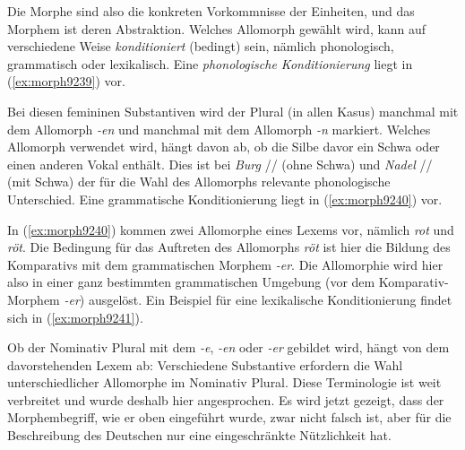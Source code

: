 Die Morphe sind also die konkreten Vorkommnisse der Einheiten, und das Morphem ist deren Abstraktion.
Welches Allomorph gewählt wird, kann auf verschiedene Weise \textit{konditioniert} (bedingt) sein, nämlich phonologisch, grammatisch oder lexikalisch.
Eine \textit{phonologische Konditionierung} liegt in (\ref{ex:morph9239}) vor.


\begin{exe}
  \ex{\label{ex:morph9239}}
  \begin{xlist}
  \end{xlist}
\end{exe}

Bei diesen femininen Substantiven wird der Plural (in allen Kasus) manchmal mit dem Allomorph \textit{-en} und manchmal mit dem Allomorph \textit{-n} markiert.
Welches Allomorph verwendet wird, hängt davon ab, ob die Silbe davor ein Schwa oder einen anderen Vokal enthält.
Dies ist bei \textit{Burg} // (ohne Schwa) und \textit{Nadel} // (mit Schwa) der für die Wahl des Allomorphs relevante phonologische Unterschied.
Eine grammatische Konditionierung liegt in (\ref{ex:morph9240}) vor.

\begin{exe}
  \ex \label{ex:morph9240}
  \begin{xlist}
  \end{xlist}
\end{exe}

In (\ref{ex:morph9240}) kommen zwei Allomorphe eines Lexems vor, nämlich \textit{rot} und \textit{röt}.
Die Bedingung für das Auftreten des Allomorphs \textit{röt} ist hier die Bildung des Komparativs mit dem grammatischen Morphem \textit{-er}.
Die Allomorphie wird hier also in einer ganz bestimmten grammatischen Umgebung (vor dem Komparativ-Morphem \textit{-er}) ausgelöst.
Ein Beispiel für eine lexikalische Konditionierung findet sich in (\ref{ex:morph9241}).

\begin{exe}
  \ex \label{ex:morph9241}
  \begin{xlist}
  \end{xlist}
\end{exe}

Ob der Nominativ Plural mit dem \textit{-e}, \textit{-en} oder \textit{-er} gebildet wird, hängt von dem davorstehenden Lexem ab:
Verschiedene Substantive erfordern die Wahl unterschiedlicher Allomorphe im Nominativ Plural.
Diese Terminologie ist weit verbreitet und wurde deshalb hier angesprochen.
Es wird jetzt gezeigt, dass der Morphembegriff, wie er oben eingeführt wurde, zwar nicht falsch ist, aber für die Beschreibung des Deutschen nur eine eingeschränkte Nützlichkeit hat.

